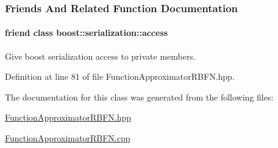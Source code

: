 \subsubsection{Friends And Related Function Documentation}
\hypertarget{classDmpBbo_1_1FunctionApproximatorRBFN_ac98d07dd8f7b70e16ccb9a01abf56b9c}{
\paragraph[{boost\+::serialization\+::access}]{\setlength{\rightskip}{0pt plus 5cm}friend class boost\+::serialization\+::access\hspace{0.3cm}{\ttfamily [friend]}}}\label{classDmpBbo_1_1FunctionApproximatorRBFN_ac98d07dd8f7b70e16ccb9a01abf56b9c}


Give boost serialization access to private members. 



Definition at line 81 of file Function\+Approximator\+R\+B\+F\+N.\+hpp.



The documentation for this class was generated from the following files\+:\begin{DoxyCompactItemize}
\item 
\hyperlink{FunctionApproximatorRBFN_8hpp}{Function\+Approximator\+R\+B\+F\+N.\+hpp}\item 
\hyperlink{FunctionApproximatorRBFN_8cpp}{Function\+Approximator\+R\+B\+F\+N.\+cpp}\end{DoxyCompactItemize}
